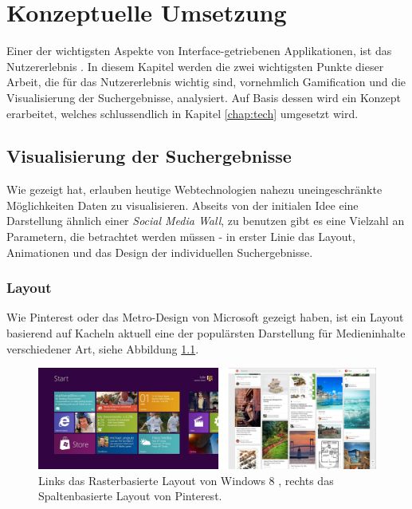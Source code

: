 \documentclass[12pt,twoside]{book}
\begin{document}
\chapter{Konzeptuelle Umsetzung}\label{chap:concept}

Einer der wichtigsten Aspekte von Interface-getriebenen Applikationen, ist das Nutzererlebnis \citep[8 - 17]{garrett2010elements}. In diesem Kapitel werden die zwei wichtigsten Punkte dieser Arbeit, die für das Nutzererlebnis wichtig sind, vornehmlich Gamification und die Visualisierung der Suchergebnisse, analysiert. Auf Basis dessen wird ein Konzept erarbeitet, welches schlussendlich in Kapitel \ref{chap:tech} umgesetzt wird.

\section{Visualisierung der Suchergebnisse}\label{chap:concept:wall}

Wie \cite{bostock2011d3} gezeigt hat, erlauben heutige Webtechnologien nahezu uneingeschränkte Möglichkeiten Daten zu visualisieren. Abseits von der initialen Idee eine Darstellung ähnlich einer \textit{Social Media Wall}, zu benutzen gibt es eine Vielzahl an Parametern, die betrachtet werden müssen - in erster Linie das Layout, Animationen und das Design der individuellen Suchergebnisse.

\subsection{Layout}

Wie Pinterest \cite{pinterest} oder das Metro-Design von Microsoft gezeigt haben, ist ein Layout basierend auf Kacheln aktuell eine der populärsten Darstellung für Medieninhalte verschiedener Art, siehe Abbildung \ref{fig:metro_pinterest}.

\begin{figure}[htbp]
    \centering
    \includegraphics[width=1.0\textwidth]{images/metro_pinterest.png}
    \caption{Links das Rasterbasierte Layout von Windows 8 \cite{metrodesign}, rechts das Spaltenbasierte Layout von Pinterest.}
    \label{fig:metro_pinterest}
  \end{figure}
\end{document}

